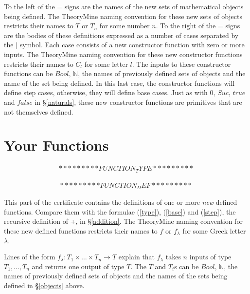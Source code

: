 \documentclass[twocolumn]{article}
\newcommand{\nat}{\mathbb{N}}
\begin{document}
To the left of the = signs are the names of the new sets of mathematical objects
being defined.  The TheoryMine naming convention for these new sets of objects
restricts their names to $T$ or $T_n$ for some number $n$. To the right of the =
signs are the bodies of these definitions expressed as a number of cases
separated by the $|$ symbol. Each case consists of a new constructor function
with zero or more inputs. The TheoryMine naming convention for these new
constructor functions restricts their names to $C_l$ for some letter $l$. The
inputs to these constructor functions can be $Bool$, $\nat$, the names of previously
defined sets of objects and the name of the set being defined. In this last
case, the constructor functions will define step cases, otherwise, they will
define base cases. Just as with $0$, $Suc$, $true$ and $false$ in
\S\ref{naturals}, these new constructor functions are primitives that are not
themselves defined.

\section{Your Functions}
\label{functions}

\begin{gather*}
*********FUNCTION_TYPE*********
\end{gather*}

\begin{gather*}
*********FUNCTION_DEF*********
\end{gather*}

This part of the certificate contains the definitions of one or more {\em new}
defined functions. Compare them with the formulae (\ref{type}), (\ref{base})
and (\ref{step}), the recursive definition of +, in \S\ref{addition}. The
TheoryMine naming convention for these new defined functions restricts their
names to $f$ or $f_{\lambda}$ for some Greek letter $\lambda$.

Lines of the form $f_{\lambda} : T_1 \times \ldots \times T_n \rightarrow T$
explain that $f_{\lambda}$ takes $n$ inputs of type $T_1, \ldots, T_n$ and
returns one output of type $T$. The $T$ and $T_i$s can be $Bool$, $\nat$, the names of
previously defined sets of objects and the names of the sets being defined in
\S\ref{objects} above. 
\end{document}
